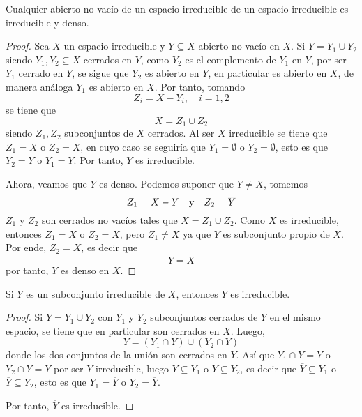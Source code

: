 \documentclass[12pt]{report}
\theoremstyle{largebreak}
\begin{document}
    \begin{exa}
        Cualquier abierto no vacío de un espacio irreducible de un espacio irreducible es irreducible y denso.
    \end{exa}

    \begin{proof}
        Sea $X$ un espacio irreducible y $Y\subseteq X$ abierto no vacío en $X$. Si $Y=Y_1\cup Y_2$ siendo $Y_1,Y_2\subseteq X$ cerrados en $Y$, como $Y_2$ es el complemento de $Y_1$ en $Y$, por ser $Y_1$ cerrado en $Y$, se sigue que $Y_2$ es abierto en $Y$, en particular es abierto en $X$, de manera análoga $Y_1$ es abierto en $X$. Por tanto, tomando
        \begin{equation*}
            Z_i=X-Y_i,\quad i=1,2
        \end{equation*}
        se tiene que
        \begin{equation*}
            X=Z_1\cup Z_2
        \end{equation*}
        siendo $Z_1,Z_2$ subconjuntos de $X$ cerrados. Al ser $X$ irreducible se tiene que $Z_1=X$ o $Z_2=X$, en cuyo caso se seguiría que $Y_1=\emptyset$ o $Y_2=\emptyset$, esto es que $Y_2=Y$ o $Y_1=Y$. Por tanto, $Y$ es irreducible.

        Ahora, veamos que $Y$ es denso. Podemos suponer que $Y\neq X$, tomemos
        \begin{equation*}
            Z_1=X-Y\quad\textup{y}\quad Z_2=\overline{Y}
        \end{equation*}
        $Z_1$ y $Z_2$ son cerrados no vacíos tales que $X=Z_1\cup Z_2$. Como $X$ es irreducible, entonces $Z_1=X$ o $Z_2=X$, pero $Z_1\neq X$ ya que $Y$ es subconjunto propio de $X$. Por ende, $Z_2=X$, es decir que
        \begin{equation*}
            \overline{Y}=X
        \end{equation*}
        por tanto, $Y$ es denso en $X$.
    \end{proof}

    \begin{exa}
        Si $Y$ es un subconjunto irreducible de $X$, entonces $\overline{Y}$ es irreducible. 
    \end{exa}

    \begin{proof}
        Si $\overline{Y}=Y_1\cup Y_2$ con $Y_1$ y $Y_2$ subconjuntos cerrados de $\overline{Y}$ en el mismo espacio, se tiene que en particular son cerrados en $X$. Luego,
        \begin{equation*}
            Y=(Y_1\cap Y)\cup(Y_2\cap Y)
        \end{equation*}
        donde los dos conjuntos de la unión son cerrados en $Y$. Así que $Y_1\cap Y=Y$ o $Y_2\cap Y=Y$ por ser $Y$ irreducible, luego $Y\subseteq Y_1$ o $Y\subseteq Y_2$, es decir que $\overline{Y}\subseteq Y_1$ o $\overline{Y}\subseteq Y_2$, esto es que $Y_1=\overline{Y}$ o $Y_2=\overline{Y}$.
        
        Por tanto, $\overline{Y}$ es irreducible.
    \end{proof}
\end{document}
